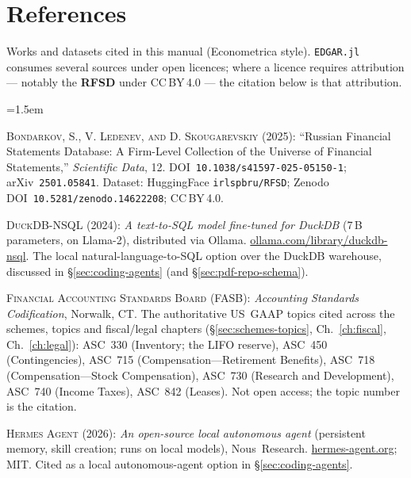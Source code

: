 \documentclass[11pt,a4paper]{report}
\begin{document}
\chapter{References}
\label{ch:references}

\noindent Works and datasets cited in this manual (Econometrica style). \texttt{EDGAR.jl} consumes several
sources under open licences; where a licence requires attribution --- notably the \textbf{RFSD} under
CC\,BY\,4.0 --- the citation below is that attribution.

\begingroup
\setlength{\parindent}{-1.5em}
\leftskip=1.5em
\setlength{\parskip}{6pt}
\par

\textsc{Bondarkov, S., V. Ledenev, \textsc{and} D. Skougarevskiy} (2025): ``Russian Financial Statements
Database: A Firm-Level Collection of the Universe of Financial Statements,'' \emph{Scientific Data}, 12.
DOI~\texttt{10.1038/s41597-025-05150-1}; arXiv~\texttt{2501.05841}. Dataset: HuggingFace
\texttt{irlspbru/RFSD}; Zenodo DOI~\texttt{10.5281/zenodo.14622208}; CC\,BY\,4.0.
\par

\textsc{DuckDB-NSQL} (2024): \emph{A text-to-SQL model fine-tuned for DuckDB} (7\,B parameters, on Llama-2),
distributed via Ollama. \href{https://ollama.com/library/duckdb-nsql}{ollama.com/library/duckdb-nsql}. The
local natural-language-to-SQL option over the DuckDB warehouse, discussed in \S\ref{sec:coding-agents} (and
\S\ref{sec:pdf-repo-schema}).
\par

\textsc{Financial Accounting Standards Board} (FASB): \emph{Accounting Standards Codification}, Norwalk, CT.
The authoritative US~GAAP topics cited across the schemes, topics and fiscal/legal chapters
(\S\ref{sec:schemes-topics}, Ch.~\ref{ch:fiscal}, Ch.~\ref{ch:legal}): ASC~330 (Inventory; the LIFO reserve),
ASC~450 (Contingencies), ASC~715 (Compensation---Retirement Benefits), ASC~718 (Compensation---Stock
Compensation), ASC~730 (Research and Development), ASC~740 (Income Taxes), ASC~842 (Leases). Not open access;
the topic number is the citation.
\par

\textsc{Hermes Agent} (2026): \emph{An open-source local autonomous agent} (persistent memory, skill creation;
runs on local models), Nous~Research. \href{https://hermes-agent.org}{hermes-agent.org}; MIT. Cited as a local
autonomous-agent option in \S\ref{sec:coding-agents}.
\par
\end{document}
